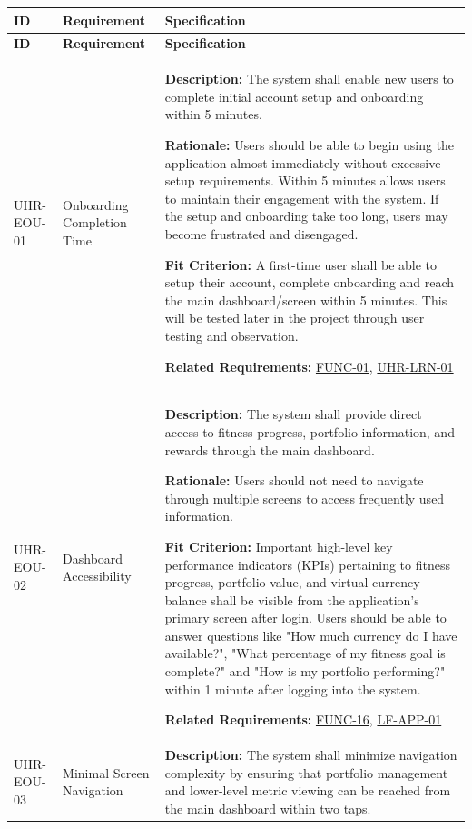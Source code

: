 \documentclass[12pt]{article}
\newcommand{\acr}[3]{\phantomsection\label{acr:#1}#2 (#3)}
\begin{document}
\small
\setlength{\tabcolsep}{4pt}
\begin{xltabular}{\textwidth}{|p{2.6cm}|p{3.4cm}|X|}
\hline
\textbf{ID} & \textbf{Requirement} & \textbf{Specification} \\
\hline
\endfirsthead
\hline
\textbf{ID} & \textbf{Requirement} & \textbf{Specification} \\
\hline
\endhead

UHR-EOU-01\hypertarget{req:UHR-EOU-01}{} & 
Onboarding Completion Time & 
\textbf{Description:} The system shall enable new users to complete initial account setup and onboarding within 5 minutes. 

\textbf{Rationale:} Users should be able to begin using the application almost immediately without excessive setup requirements. Within 5 minutes allows users to maintain their engagement with the system. If the setup and onboarding take too long, users may become frustrated and disengaged. 

\textbf{Fit Criterion:} A first-time user shall be able to setup their account, complete onboarding and reach the main dashboard/screen within 5 minutes. This will be tested later in the project through user testing and observation.

\textbf{Related Requirements:} \hyperlink{req:FUNC-01}{FUNC-01}, \hyperlink{req:UHR-LRN-01}{UHR-LRN-01}\\
\hline

UHR-EOU-02\hypertarget{req:UHR-EOU-02}{} & 
Dashboard Accessibility & 
\textbf{Description:} The system shall provide direct access to fitness progress, portfolio information, and rewards through the main dashboard.

\textbf{Rationale:} Users should not need to navigate through multiple screens to access frequently used information. 

\textbf{Fit Criterion:} Important high-level \acr{KPI}{key performance indicators}{KPIs} pertaining to fitness progress, portfolio value, and virtual currency balance shall be visible from the application's primary screen after login. Users should be able to answer questions like "How much currency do I have available?", "What percentage of my fitness goal is complete?" and "How is my portfolio performing?" within 1 minute after logging into the system. 

\textbf{Related Requirements:} \hyperlink{req:FUNC-16}{FUNC-16}, \hyperlink{req:LF-APP-01}{LF-APP-01}\\
\hline

UHR-EOU-03\hypertarget{req:UHR-EOU-03}{} & 
Minimal Screen Navigation & 
\textbf{Description:} The system shall minimize navigation complexity by ensuring that portfolio management and lower-level metric viewing can be reached from the main dashboard within two taps.


\end{xltabular}
\end{document}
